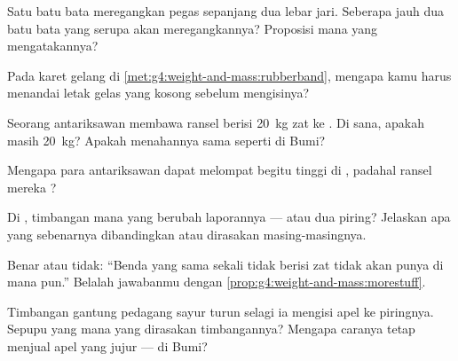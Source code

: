 \begin{exercise}[$\star$]\label{exo:g4:weight-and-mass:3}
Satu batu bata meregangkan pegas  sepanjang dua lebar
jari. Seberapa jauh dua batu bata yang serupa akan meregangkannya?
Proposisi mana yang mengatakannya?
\end{exercise}

\begin{exercise}[$\star$]\label{exo:g4:weight-and-mass:4}
Pada  karet gelang di
\cref{met:g4:weight-and-mass:rubberband}, mengapa kamu harus menandai
letak gelas yang kosong sebelum mengisinya?
\end{exercise}

\begin{exercise}[$\star$]\label{exo:g4:weight-and-mass:5}
Seorang antariksawan membawa ransel berisi \qty{20}{kg} zat ke .
Di sana, apakah  masih \qty{20}{kg}? Apakah menahannya sama
 seperti di Bumi?
\end{exercise}

\begin{exercise}[$\star$]\label{exo:g4:weight-and-mass:6}
Mengapa para antariksawan dapat melompat begitu tinggi di ,
padahal ransel mereka ?
\end{exercise}

\begin{exercise}[$\star$]\label{exo:g4:weight-and-mass:7}
Di , timbangan mana yang berubah laporannya ---  atau
 dua piring? Jelaskan apa yang sebenarnya dibandingkan atau
dirasakan masing-masingnya.
\end{exercise}

\begin{exercise}[$\star$]\label{exo:g4:weight-and-mass:8}
Benar atau tidak: ``Benda yang sama sekali tidak berisi zat tidak akan
punya  di mana pun.'' Belalah jawabanmu dengan
\cref{prop:g4:weight-and-mass:morestuff}.
\end{exercise}

\begin{exercise}[$\star$]\label{exo:g4:weight-and-mass:9}
Timbangan gantung pedagang sayur turun selagi ia mengisi apel ke
piringnya. Sepupu yang mana yang dirasakan timbangannya? Mengapa
caranya tetap menjual  apel yang jujur --- di Bumi?
\end{exercise}

